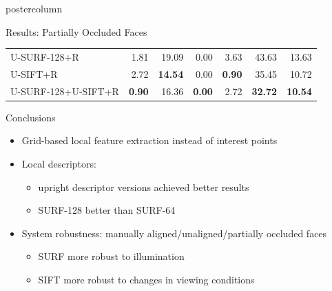 \documentclass[final,hyperref={pdfpagelabels=false}]{beamer}
\begin{document}
\begin{frame}
\begin{columns}
\begin{column}{.49\textwidth}
\begin{beamercolorbox}[center,wd=\textwidth]{postercolumn}
\begin{minipage}[T]{.95\textwidth}
{\begin{block}{Results: Partially Occluded Faces}
\begin{table}
\begin{tabular}{@{} l @{} r r r r r r@{}}
                  \cmidrule(r){1-1}     \cmidrule(lr){2-2}   \cmidrule(lr){3-3} \cmidrule(lr){4-4}   \cmidrule(lr){5-5}  \cmidrule(lr){6-6}  \cmidrule(l){7-7}
                  U-SURF-128+R        & 1.81             & 19.09          & 0.00                & 3.63             & 43.63     & 13.63 \\
                  U-SIFT+R            & 2.72             & \textbf{14.54} & 0.00                & \textbf{0.90}    & 35.45     & 10.72 \\
                  U-SURF-128+U-SIFT+R &  \textbf{0.90}   & 16.36          & \textbf{0.00}       & 2.72             & \textbf{32.72} & \textbf{10.54} \\       
                  \bottomrule
                \end{tabular}
              \end{table}
            \end{block}
            \vfill
            \begin{block}{Conclusions}
              \begin{itemize}
              \item Grid-based local feature extraction instead of interest points
              \item Local descriptors:
                \begin{itemize}
                \item upright descriptor versions achieved better results
                \item SURF-128 better than SURF-64
                \end{itemize}
              \item System robustness: manually aligned/unaligned/partially occluded faces
                \begin{itemize}
                \item SURF more robust to illumination
                \item SIFT more robust to changes in viewing conditions
                \end{itemize}

\end{itemize}
\end{block}}
\end{minipage}
\end{beamercolorbox}
\end{column}
\end{columns}
\end{frame}
\end{document}
